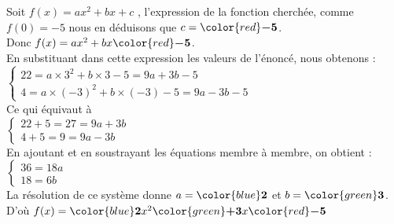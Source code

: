 \documentclass[a4paper,11pt,exos]{nsi} %
\begin{document}
Soit $f(x)=ax^2+bx+c$ , l'expression de la fonction cherchée, comme $f(0)=-5$ nous en déduisons que $c={\color{red}\boldsymbol{-5}}$.\\Donc $f(x)=ax^2+bx{\color{red}\boldsymbol{-5}}$.\\En substituant dans cette expression les valeurs de l'énoncé, nous obtenons :\\$\begin{cases}
    22=a\times3^2+b\times3-5=9a +3b -5 \\
    4=a\times(-3)^2+b\times(-3)-5=9a -3b -5
     \end{cases}$\\Ce qui équivaut à \\$\begin{cases}
     22+5=27=9a +3b \\
     4+5=9=9a -3b
       \end{cases}$\\En ajoutant et en soustrayant les équations membre à membre, on obtient :\\
    $\begin{cases}
    36=18a \\
    18=6b
     \end{cases}$\\La résolution de ce système donne $a={\color{blue}\boldsymbol{2}}$ et $b={\color{green}\boldsymbol{3}}$.\\D'où $f(x)={\color{blue}\boldsymbol{2}}x^2 {\color{green}\boldsymbol{+3}}x  {\color{red}\boldsymbol{-5}}$\\
\end{document}

